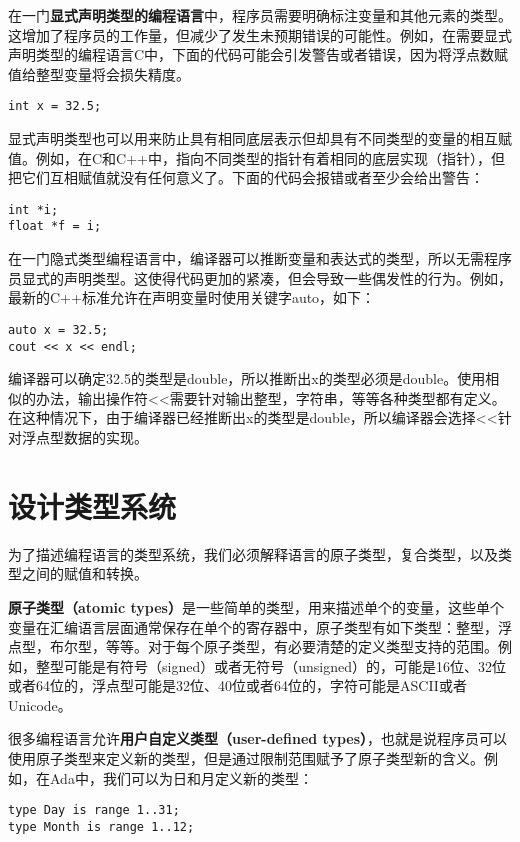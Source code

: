 \documentclass[cn,11pt,chinese]{elegantbook}
\begin{document}
在一门\textbf{显式声明类型的编程语言}中，程序员需要明确标注变量和其他元素的类型。这增加了程序员的工作量，但减少了发生未预期错误的可能性。例如，在需要显式声明类型的编程语言C中，下面的代码可能会引发警告或者错误，因为将浮点数赋值给整型变量将会损失精度。

\begin{verbatim}
int x = 32.5;
\end{verbatim}

显式声明类型也可以用来防止具有相同底层表示但却具有不同类型的变量的相互赋值。例如，在C和C++中，指向不同类型的指针有着相同的底层实现（指针），但把它们互相赋值就没有任何意义了。下面的代码会报错或者至少会给出警告：

\begin{verbatim}
int *i;
float *f = i;
\end{verbatim}

在一门隐式类型编程语言中，编译器可以推断变量和表达式的类型，所以无需程序员显式的声明类型。这使得代码更加的紧凑，但会导致一些偶发性的行为。例如，最新的C++标准允许在声明变量时使用关键字auto，如下：

\begin{verbatim}
auto x = 32.5;
cout << x << endl;
\end{verbatim}

编译器可以确定32.5的类型是double，所以推断出x的类型必须是double。使用相似的办法，输出操作符<<需要针对输出整型，字符串，等等各种类型都有定义。在这种情况下，由于编译器已经推断出x的类型是double，所以编译器会选择<<针对浮点型数据的实现。

\section{设计类型系统}

为了描述编程语言的类型系统，我们必须解释语言的原子类型，复合类型，以及类型之间的赋值和转换。

\textbf{原子类型（atomic types）}是一些简单的类型，用来描述单个的变量，这些单个变量在汇编语言层面通常保存在单个的寄存器中，原子类型有如下类型：整型，浮点型，布尔型，等等。对于每个原子类型，有必要清楚的定义类型支持的范围。例如，整型可能是有符号（signed）或者无符号（unsigned）的，可能是16位、32位或者64位的，浮点型可能是32位、40位或者64位的，字符可能是ASCII或者Unicode。

很多编程语言允许\textbf{用户自定义类型（user-defined types）}，也就是说程序员可以使用原子类型来定义新的类型，但是通过限制范围赋予了原子类型新的含义。例如，在Ada中，我们可以为日和月定义新的类型：

\begin{verbatim}
type Day is range 1..31;
type Month is range 1..12;
\end{verbatim}
\end{document}
